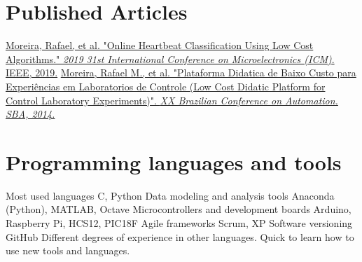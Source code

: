 \documentclass[]{cv-style}          %
\begin{document}
\section{Published Articles}
\vspace{-0.3cm}
\begin{entrylist}
\entry
{}
{}
{\vspace{-0.4cm}}
{\href{https://doi.org/10.1109/ICM48031.2019.9021277}{Moreira, Rafael, et al. "Online Heartbeat Classification Using Low Cost Algorithms." \textit{2019 31st International Conference on Microelectronics (ICM)}. IEEE, 2019.}}
{}
\entry
{}
{}
{\vspace{-0.5cm}}
{\href{http://www.swge.inf.br/CBA2014/anais/PDF/1569927865.pdf}{Moreira, Rafael M., et al. "Plataforma Didatica de Baixo Custo para Experiências em Laboratorios de Controle (Low Cost Didatic Platform for Control Laboratory Experiments)". \textit{XX Brazilian Conference on Automation. SBA, 2014.}}}
{}
\end{entrylist}
{\vspace{-0.4cm}}

\section{Programming languages and tools}
\vspace{-0.3cm}
\begin{entrylist}
\entry
{}
{Most used languages}
{C, Python}
{\vspace{-0.5cm}}
\entry
{}
{Data modeling and analysis tools}
{Anaconda (Python), MATLAB, Octave}
{\vspace{-0.5cm}}
\entry
{}
{Microcontrollers and development boards}
{Arduino, Raspberry Pi, HCS12, PIC18F}
{\vspace{-0.5cm}}
\entry
{}
{Agile frameworks}
{Scrum, XP}
{\vspace{-0.5cm}}
\entry
{}
{Software versioning}
{GitHub}
{\vspace{-0.5cm}}
\entry
{}
{Different degrees of experience in other languages. Quick to learn how to use new tools and languages. }
{}
{\vspace{-4.0cm}}
\end{entrylist}
\end{document}

